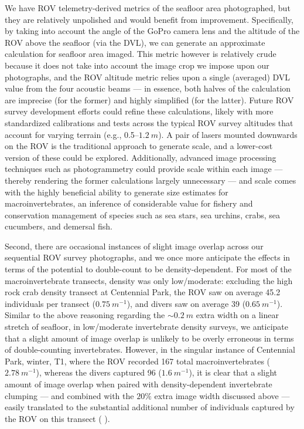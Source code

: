 \documentclass[11pt]{article}
\newcommand{\boxedref}[2]{%
	\begingroup
	\setlength{\fboxrule}{0.8pt}%
	\setlength{\fboxsep}{1.5pt}%
	\textcolor{linkcyan}{%
		\fbox{%
			\textcolor{black}{%
				\hyperref[#2]{#1~\ref*{#2}}%
			}%
		}%
	}%
	\endgroup
}
\newcommand{\figref}[1]{\boxedref{Fig.}{#1}}\newcommand{\tabref}[1]{\boxedref{Table}{#1}}
\begin{document}
We have ROV telemetry-derived metrics of the seafloor area photographed, but 
they are relatively unpolished and would benefit from improvement. 
Specifically, by taking into account the angle of the GoPro camera lens and the 
altitude of the ROV above the seafloor (via the DVL), we can generate an 
approximate calculation for seafloor area imaged. 
This metric however is relatively crude because it does not take into account 
the image crop we impose upon our photographs, and the ROV altitude metric 
relies upon a single (averaged) DVL value from the four acoustic beams --- in 
essence, both halves of the calculation are imprecise (for the former) and 
highly simplified (for the latter).
Future ROV survey development efforts could refine these calculations, likely 
with more standardized calibrations and tests across the typical ROV survey 
altitudes that account for varying terrain (e.g., 0.5--$1.2~m$).
A pair of lasers mounted downwards on the ROV is the traditional approach to 
generate scale, and a lower-cost version of these could be explored. 
Additionally, advanced image processing techniques such as photogrammetry could 
provide scale within each image --- thereby rendering the former calculations 
largely unnecessary --- and scale comes with the highly beneficial ability to  
generate size estimates for macroinvertebrates, an inference of considerable 
value for fishery and conservation management of species such as sea stars, sea 
urchins, crabs, sea cucumbers, and demersal fish. 

Second, there are occasional instances of slight image overlap across our 
sequential ROV survey photographs, and we once more anticipate the effects in 
terms of the potential to double-count to be density-dependent. 
For most of the macroinvertebrate transects, density was only low/moderate: 
excluding the high rock crab density transect at Centennial Park, the ROV saw 
on average 45.2 individuals per transect ($0.75~m^{-1}$), and divers saw on 
average 39 ($0.65~m^{-1}$).
Similar to the above reasoning regarding the $\sim 0.2~m$ extra width on a 
linear stretch of seafloor, in low/moderate invertebrate density surveys, we 
anticipate that a slight amount of image overlap is unlikely to be overly 
erroneous in terms of double-counting invertebrates. 
However, in the singular instance of Centennial Park, winter, T1, where the ROV 
recorded 167 total macroinvertebrates ($2.78~m^{-1}$), whereas the divers 
captured 96 ($1.6~m^{-1}$), it is clear that a slight amount of image overlap 
when paired with density-dependent invertebrate clumping --- and combined with 
the $20\%$ extra image width discussed above --- easily translated to the 
substantial additional number of individuals captured by the ROV on this 
transect (\figref{fig:double_count}).
\end{document}
